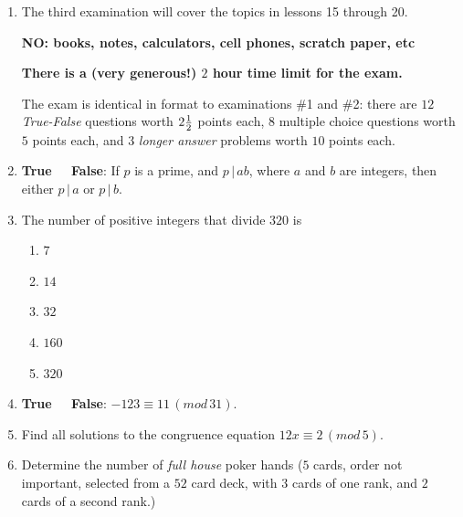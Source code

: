 \documentclass[11pt]{amsart}
\begin{document}
\begin{enumerate}

\item[]
\centerline{The third examination will cover the topics in lessons 15 through 20.}
\medskip
\centerline{\bf NO: books, notes, calculators, cell phones, scratch paper, etc}
\medskip
\centerline{\bf There is a (very generous!) $2$ hour time limit for the exam.}
\medskip

The exam is identical in format to examinations \#1 and \#2:
there are $12$ {\it True-False} questions worth $2{1\over2}$ points each, 
$8$ multiple choice questions worth $5$ points each, and $3$ {\it longer answer} 
problems worth $10$ points each. 
\medskip 

\item {\bf True \ \  False}: If $p$ is a prime, and $p\,|\,ab$, where $a$ and $b$ are integers, 
then either $p\,|\,a$ or $p\,|\,b$.

\medskip

\item The number of positive integers that divide $320$ is
\begin{enumerate}

\item $7$\\[4pt]

\item $14$\\[4pt]

\item $32$\\[4pt]

\item $160$\\[4pt]

\item $320$\\

\end{enumerate}

\medskip

\item {\bf True \ \  False}: $-123\equiv 11 \,(mod\,31)$.

\medskip

\item  Find all solutions to the congruence equation $12x\equiv 2 \,(mod\,5)$.

\medskip

\item Determine the number of {\it full house} poker hands ($5$ cards, order not important, selected
from a $52$ card deck, with $3$ cards of one rank, and $2$ cards of a second rank.)


\end{enumerate}
\end{document}
